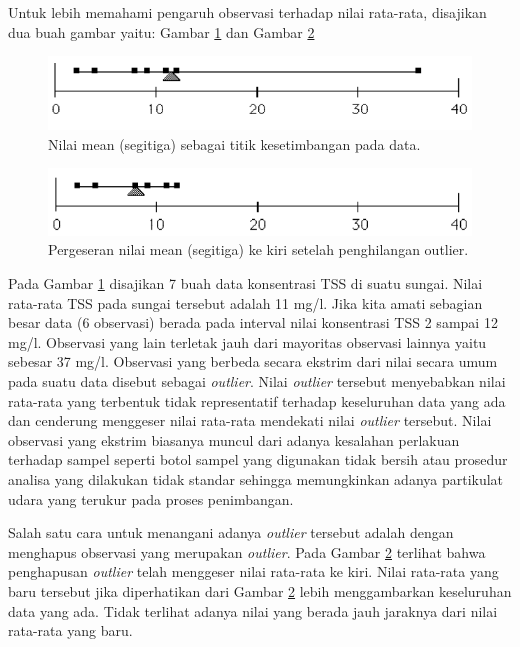 \documentclass[]{book}
\begin{document}
Untuk lebih memahami pengaruh observasi terhadap nilai rata-rata,
disajikan dua buah gambar yaitu: Gambar \ref{fig:mean1} dan Gambar
\ref{fig:mean2}

\begin{figure}

{\centering \includegraphics[width=0.7\linewidth]{mean1} 

}

\caption{Nilai mean (segitiga) sebagai titik kesetimbangan pada data.}\label{fig:mean1}
\end{figure}

\begin{figure}

{\centering \includegraphics[width=0.7\linewidth]{mean2} 

}

\caption{Pergeseran nilai mean (segitiga) ke kiri setelah penghilangan outlier.}\label{fig:mean2}
\end{figure}

Pada Gambar \ref{fig:mean1} disajikan 7 buah data konsentrasi TSS di
suatu sungai. Nilai rata-rata TSS pada sungai tersebut adalah 11 mg/l.
Jika kita amati sebagian besar data (6 observasi) berada pada interval
nilai konsentrasi TSS 2 sampai 12 mg/l. Observasi yang lain terletak
jauh dari mayoritas observasi lainnya yaitu sebesar 37 mg/l. Observasi
yang berbeda secara ekstrim dari nilai secara umum pada suatu data
disebut sebagai \emph{outlier}. Nilai \emph{outlier} tersebut
menyebabkan nilai rata-rata yang terbentuk tidak representatif terhadap
keseluruhan data yang ada dan cenderung menggeser nilai rata-rata
mendekati nilai \emph{outlier} tersebut. Nilai observasi yang ekstrim
biasanya muncul dari adanya kesalahan perlakuan terhadap sampel seperti
botol sampel yang digunakan tidak bersih atau prosedur analisa yang
dilakukan tidak standar sehingga memungkinkan adanya partikulat udara
yang terukur pada proses penimbangan.

Salah satu cara untuk menangani adanya \emph{outlier} tersebut adalah
dengan menghapus observasi yang merupakan \emph{outlier}. Pada Gambar
\ref{fig:mean2} terlihat bahwa penghapusan \emph{outlier} telah
menggeser nilai rata-rata ke kiri. Nilai rata-rata yang baru tersebut
jika diperhatikan dari Gambar \ref{fig:mean2} lebih menggambarkan
keseluruhan data yang ada. Tidak terlihat adanya nilai yang berada jauh
jaraknya dari nilai rata-rata yang baru.
\end{document}
